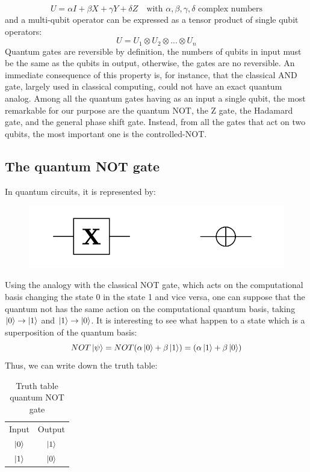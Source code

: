 \begin{equation*}
    U = \alpha I+\beta X+\gamma Y+\delta Z \quad \text{with $\alpha,\beta,\gamma,\delta$ complex numbers}
\end{equation*}
and a multi-qubit operator can be expressed as a tensor product of single qubit operators:
\begin{equation*}
    U = U_1 \otimes U_2 \otimes ... \otimes U_n
\end{equation*}
Quantum gates are reversible by definition, the numbers of qubits in input must be the same as the qubits in output, otherwise, the gates are no reversible. An immediate consequence of this property is, for instance, that the classical AND gate, largely used in classical computing, could not have an exact quantum analog.
Among all the quantum gates having as an input a single qubit, the most remarkable for our purpose are the quantum NOT, the Z gate, the Hadamard gate, and the general phase shift gate.
Instead, from all the gates that act on two qubits, the most important one is the controlled-NOT.


\subsection*{The quantum NOT gate}
In quantum circuits, it is represented by: \begin{figure}[H]
\centering
\includegraphics{Mainmatter/images/XGATE.png}
\end{figure}
Using the analogy with the classical NOT gate, which acts on the computational basis changing the state 0 in the state 1 and vice versa, one can suppose that the quantum not has the same action on the computational quantum basis, taking $\ket{0} \to \ket{1}$ and $\ket{1} \to \ket{0}$. It is interesting to see what happen to a state which is a superposition of the quantum basis: 
\begin{equation*}
    NOT \ket{\psi} = NOT(\alpha\ket{0} +\beta\ket{1}) = (\alpha\ket{1} +\beta\ket{0})
\end{equation*}
Thus, we can write down the truth table: 
\begin{table}[h!]
    \centering
    \begin{tabular}{c|c}
         Input & Output \\
          $\ket{0}$ & $\ket{1}$ \\
          $\ket{1}$ & $\ket{0}$
    \end{tabular}
    \caption{Truth table quantum NOT gate}
    \label{tab:not_gate}
\end{table}


